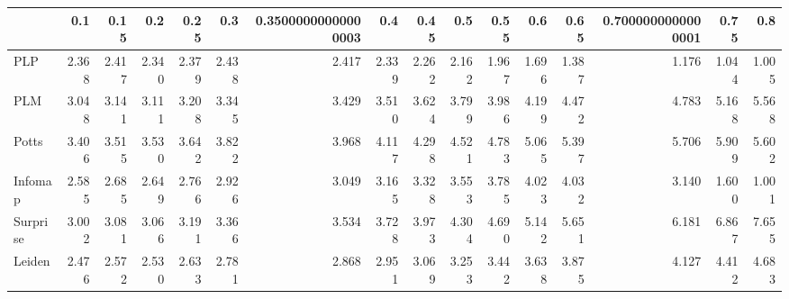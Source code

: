 \begin{tabular}{lrrrrrrrrrrrrrrr}
\toprule
{} &   0.1 &  0.15 &   0.2 &  0.25 &   0.3 & 0.35000000000000003 &   0.4 &  0.45 &   0.5 &  0.55 &   0.6 &  0.65 & 0.7000000000000001 &  0.75 &   0.8 \\
\midrule
PLP      & 2.368 & 2.417 & 2.340 & 2.379 & 2.438 &               2.417 & 2.339 & 2.262 & 2.162 & 1.967 & 1.696 & 1.387 &              1.176 & 1.044 & 1.005 \\
PLM      & 3.048 & 3.141 & 3.111 & 3.208 & 3.345 &               3.429 & 3.510 & 3.624 & 3.799 & 3.986 & 4.199 & 4.472 &              4.783 & 5.168 & 5.568 \\
Potts    & 3.406 & 3.515 & 3.530 & 3.642 & 3.822 &               3.968 & 4.117 & 4.298 & 4.521 & 4.783 & 5.065 & 5.397 &              5.706 & 5.909 & 5.602 \\
Infomap  & 2.585 & 2.685 & 2.649 & 2.766 & 2.926 &               3.049 & 3.165 & 3.328 & 3.553 & 3.785 & 4.023 & 4.032 &              3.140 & 1.600 & 1.001 \\
Surprise & 3.002 & 3.081 & 3.066 & 3.191 & 3.366 &               3.534 & 3.728 & 3.973 & 4.304 & 4.690 & 5.142 & 5.651 &              6.181 & 6.867 & 7.655 \\
Leiden   & 2.476 & 2.572 & 2.530 & 2.633 & 2.781 &               2.868 & 2.951 & 3.069 & 3.253 & 3.442 & 3.638 & 3.875 &              4.127 & 4.412 & 4.683 \\
\bottomrule
\end{tabular}
